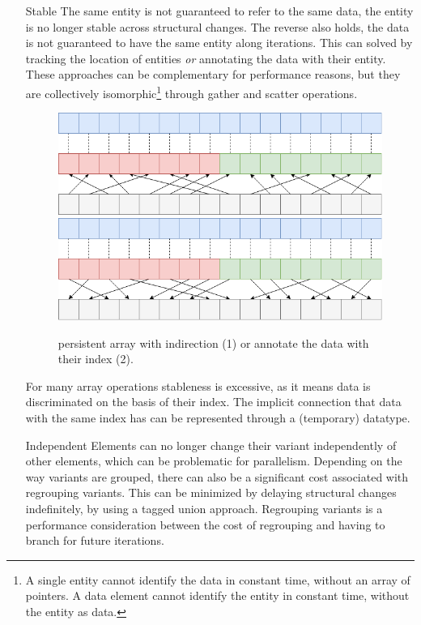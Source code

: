 \documentclass{article}
\begin{document}
\begin{itemize}
    \item [Stable] 
The same entity is not guaranteed to refer to the same data, the entity is no longer stable across structural changes.
The reverse also holds, the data is not guaranteed to have the same entity along iterations.
This can solved by tracking the location of entities {\it or} annotating the data with their entity. 
These approaches can be complementary for performance reasons, but they are collectively isomorphic\footnote{A single entity cannot identify the data in constant time, without an array of pointers. A data element cannot identify the entity in constant time, without the entity as data. } through gather and scatter operations. 

\begin{figure}[ht]
    \centering
    \includegraphics[scale=0.3]{stable1}
    \includegraphics[scale=0.3]{stable2}
    \caption{ persistent array with indirection (1) or annotate the data with their index (2). }
\end{figure}

For many array operations stableness is excessive, as it means data is discriminated on the basis of their index. 
The implicit connection that data with the same index has can be represented through a (temporary) datatype.

    \item [Independent]
Elements can no longer change their variant independently of other elements, which can be problematic for parallelism.
Depending on the way variants are grouped, there can also be a significant cost associated with regrouping variants.
This can be minimized by delaying structural changes indefinitely, by using a tagged union approach.
Regrouping variants is a performance consideration between the cost of regrouping and having to branch for future iterations.
\end{itemize}    
\end{document}

